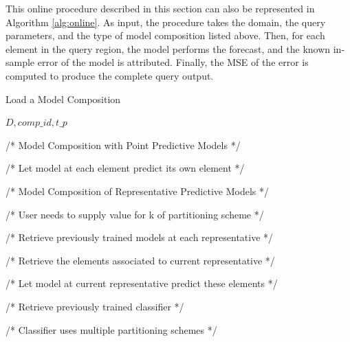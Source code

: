 This online procedure described in this section can also be represented in Algorithm \ref{alg:online}. As input, the procedure takes the domain, the query parameters, and the type of model composition listed above. Then, for each element in the query region, the model performs the forecast, and the known in-sample error of the model is attributed. Finally, the MSE of the error is computed to produce the complete query output.

\begin{algorithm}[h!]
\caption{Load a Model Composition}\label{alg:modelcomp}
\begin{algorithmic}[1] 
 {$D, comp\_id, t\_p$}


/* Model Composition with Point Predictive Models */

    
    /* Let model at each element predict its own element */
    
\EndIf

/* Model Composition of Representative Predictive Models */

    /* User needs to supply value for k of partitioning scheme */
    
    /* Retrieve previously trained models at each representative */
    
    
        /* Retrieve the elements associated to current representative */
        
        /* Let model at current representative predict these elements */
    \EndFor

\EndIf


    /* Retrieve previously trained classifier */
    
    /* Classifier uses multiple partitioning schemes */
    

\end{algorithmic}
\end{algorithm}
